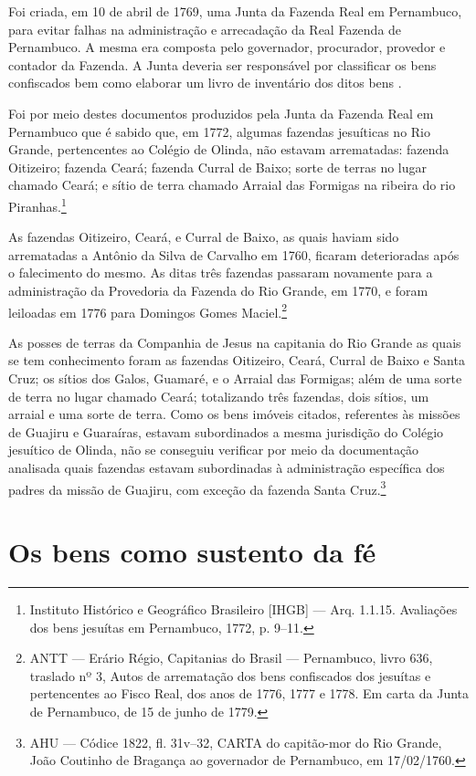 \begin{refsection}
Foi criada, em 10 de abril de 1769, uma Junta da Fazenda Real em Pernambuco, para evitar falhas na administração e arrecadação da Real Fazenda de Pernambuco. A mesma era composta pelo governador, procurador, provedor e contador da Fazenda. A Junta deveria ser responsável por classificar os bens confiscados bem como elaborar um livro de inventário dos ditos bens \cite[p.~158]{Couto1990}. 

Foi por meio destes documentos produzidos pela Junta da Fazenda Real em Pernambuco que é sabido que, em 1772, algumas fazendas jesuíticas no Rio Grande, pertencentes ao Colégio de Olinda, não estavam arrematadas: fazenda Oitizeiro; fazenda Ceará; fazenda Curral de Baixo; sorte de terras no lugar chamado Ceará; e sítio de terra chamado Arraial das Formigas na ribeira do rio Piranhas.\footnote{Instituto Histórico e Geográfico Brasileiro [IHGB] --- Arq. 1.1.15. Avaliações dos bens jesuítas em Pernambuco, 1772, p. 9--11.} 

As fazendas Oitizeiro, Ceará, e Curral de Baixo, as quais haviam sido arrematadas a Antônio da Silva de Carvalho em 1760, ficaram deterioradas após o falecimento do mesmo. As ditas três fazendas passaram novamente para a administração da Provedoria da Fazenda do Rio Grande, em 1770, e foram leiloadas em 1776 para Domingos Gomes Maciel.\footnote{ANTT --- Erário Régio, Capitanias do Brasil --- Pernambuco, livro 636, traslado nº 3, Autos de arrematação dos bens confiscados dos jesuítas e pertencentes ao Fisco Real, dos anos de 1776, 1777 e 1778. Em carta da Junta de Pernambuco, de 15 de junho de 1779.}  

As posses de terras da Companhia de Jesus na capitania do Rio Grande as quais se tem conhecimento foram as fazendas Oitizeiro, Ceará, Curral de Baixo e Santa Cruz; os sítios dos Galos, Guamaré, e o Arraial das Formigas; além de uma sorte de terra no lugar chamado Ceará; totalizando três fazendas, dois sítios, um arraial e uma sorte de terra. Como os bens imóveis citados, referentes às missões de Guajiru e Guaraíras, estavam subordinados a mesma jurisdição do Colégio jesuítico de Olinda, não se conseguiu verificar por meio da documentação analisada quais fazendas estavam subordinadas à administração específica dos padres da missão de Guajiru, com exceção da fazenda Santa Cruz.\footnote{AHU --- Códice 1822, fl. 31v--32, CARTA do capitão-mor do Rio Grande, João Coutinho de Bragança ao governador de Pernambuco, em 17/02/1760.}

\section{Os bens como sustento da fé}


\end{refsection}
